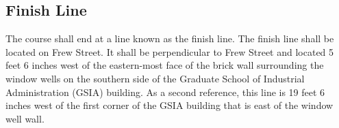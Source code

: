 \subsection{Finish Line}

	The course shall end at a line known as the finish line. The finish line shall
	be located on Frew Street. It shall be perpendicular to Frew Street and located
	5 feet 6 inches west of the eastern-most face of the brick wall surrounding the
	window wells on the southern side of the Graduate School of Industrial
	Administration (GSIA) building. As a second reference, this line is 19 feet 6
	inches west of the first corner of the GSIA building that is east of the window
	well wall.


